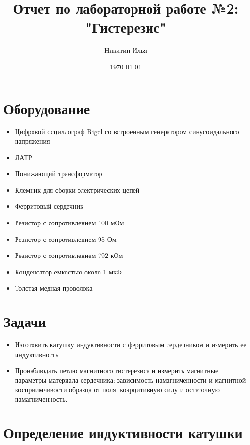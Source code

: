 \documentclass[a4paper,14pt]{extarticle}
\author{Никитин Илья}
\title{Отчет по лабораторной работе №2: "Гистерезис"}
\date{\today}
\begin{document}
	
	\maketitle
	\tableofcontents
	
	\section{Оборудование}
		\begin{itemize}
			\item Цифровой осциллограф Rigol со встроенным генератором синусоидального напряжения
			\item ЛАТР
			\item Понижающий трансформатор
			\item Клемник для сборки электрических цепей
			\item Ферритовый сердечник
			\item Резистор с сопротивлением 100 мОм
			\item Резистор с сопротивлением 95 Ом
			\item Резистор с сопротивлением 792 кОм
			\item Конденсатор емкостью около 1 мкФ
			\item Толстая медная проволока
		\end{itemize}
	\section{Задачи}
		\begin{itemize}
			\item Изготовить катушку индуктивности с ферритовым сердечником и измерить ее
			индуктивность
			\item Пронаблюдать петлю магнитного гистерезиса и измерить магнитные параметры материала сердечника: зависимость намагниченности и магнитной восприимчивости образца от поля, коэрцитивную силу и остаточную намагниченность.
		\end{itemize}
	\section{Определение индуктивности катушки}
\end{document}
